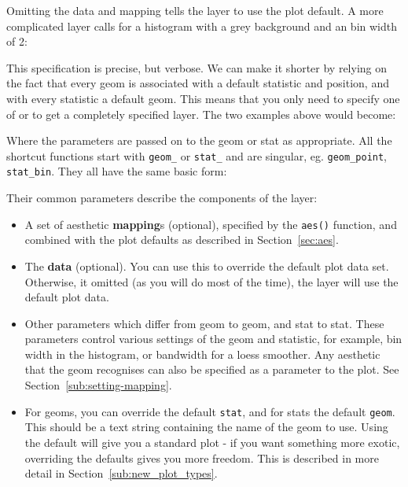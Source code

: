 % 


\noindent Omitting the data and mapping tells the layer to use the plot default.  A more complicated layer calls for a histogram with a grey background and an bin width of 2:

% 


\noindent  This specification is precise, but verbose.  We can make it shorter by relying on the fact that every geom is associated with a default statistic and position, and with every statistic a default geom.  This means that you only need to specify one of  or  to get a completely specified layer.  The two examples above would become:

% 


\noindent Where the parameters are passed on to the geom or stat as appropriate.  All the shortcut functions start with {\tt geom\_} or {\tt stat\_} and are singular, eg. {\tt geom\_point}, {\tt stat\_bin}.  They all have the same  basic form:

% 


\noindent Their common parameters describe the components of the layer:

\begin{itemize}
	\item A set of aesthetic {\bf mapping}s (optional), specified by the {\tt aes()} function, and combined with the plot defaults as described in Section~\ref{sec:aes}.

	\item The {\bf data} (optional).  You can use this to override the default plot data set.  Otherwise, it omitted  (as you will do most of the time), the layer will use the default plot data.
	
	\item Other parameters which differ from geom to geom, and stat to stat.  These parameters control various settings of the geom and statistic, for example, bin width in the histogram, or bandwidth for a loess smoother.  Any aesthetic that the geom recognises can also be specified as a parameter to the plot.  See Section~\ref{sub:setting-mapping}.
	
	\item For geoms, you can override the default {\tt stat}, and for stats the default {\tt geom}.  This should be a text string containing the name of the geom to use.  Using the default will give you a standard plot - if you want something more exotic, overriding the defaults gives you more freedom.  This is described in more detail in Section~\ref{sub:new_plot_types}.
  
\end{itemize}

